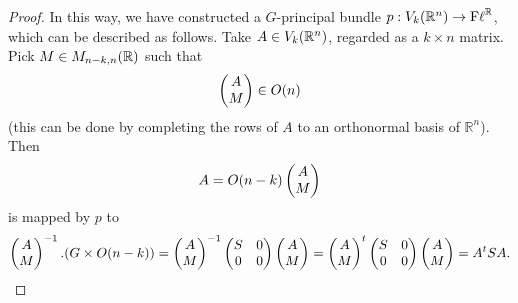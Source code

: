 \documentclass[10pt,a4paper]{amsart}
\newcommand{\Fl}{{\mathrm{F\ell}}}
\newcommand{\RR}{\mathbb R}
\begin{document}
\begin{proof}
In this way, we have constructed a $G$-principal bundle $p: {\rm V}_k(\RR^n) \to \Fl^\RR$, which can be described as follows.
Take $A\in {\rm V}_k(\RR^n)$, regarded as a $k\times n$ matrix. Pick $M\in {\rm M}_{n-k, n}(\RR)$ such that 
$$\begin{pmatrix}
A  \\
M 
\end{pmatrix}
\in {\rm O}(n)$$
(this can be done by completing the rows of $A$ to an orthonormal basis of $\RR^n$). Then
$$A=
 {\rm O}(n-k) \begin{pmatrix}
A  \\
M 
\end{pmatrix}
$$
is mapped by $p$ to
$$
\begin{pmatrix}
A  \\
M 
\end{pmatrix}^{-1} .(G\times {\rm O}(n-k))
=\begin{pmatrix}
A  \\
M 
\end{pmatrix}^{-1} 
\begin{pmatrix}
S& 0  \\
0 & 0 
\end{pmatrix}
\begin{pmatrix}
A  \\
M 
\end{pmatrix}
=\begin{pmatrix}
A  \\
M 
\end{pmatrix}^{t} 
\begin{pmatrix}
S& 0  \\
0 & 0 
\end{pmatrix}
\begin{pmatrix}
A  \\
M 
\end{pmatrix}
=A^tSA.$$
\end{proof}
\end{document}
